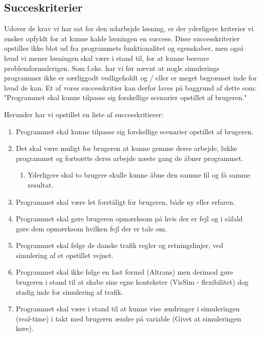 \subsection{Succeskriterier}\label{Succeskriterier}
Udover de krav vi har sat for den udarbejde løsning, er der yderligere kriterier vi ønsker opfyldt for at kunne kalde løsningen en success. Disse successkriterier opstilles ikke blot ud fra programmets funktionalitet og egenskaber, men også hvad vi mener løsningen skal være i stand til, for at kunne besvare problemformulerigen. Som f.eks. har vi før nævnt at nogle simulerings programmer ikke er særliggodt vedligeholdt og / eller er meget begrænset inde for hvad de kan. Et af vores successkritier kan derfor laves på baggrund af dette som: "Programmet skal kunne tilpasse sig forskellige scenarier opstillet af brugeren."

\vspace{5mm}
Herunder har vi opstillet en liste af successkritierer:

\begin{enumerate}
\item Programmet skal kunne tilpasse sig forskellige scenarier opstillet af brugeren.
\item Det skal være muligt for brugeren at kunne gemme deres arbejde, lukke programmet og fortsætte deres arbejde næste gang de åbner programmet.
\begin{enumerate}
\item Yderligere skal to brugere skulle kunne åbne den samme fil og få samme resultat.
\end{enumerate}
\item Programmet skal være let forståligt for brugeren, både ny eller erfaren.
\item Programmet skal gøre brugeren opmærksom på hvis der er fejl og i såfald gøre dem opmærksom hvilken fejl der er tale om.
\item Programmet skal følge de danske trafik regler og retningslinjer, ved simulering af et opstillet vejnet.
\item Programmet skal ikke følge en fast formel (Altrans) men derimod gøre brugeren i stand til at skabe sine egne kontekster (VisSim - flexibilitet) dog stadig inde for simulering af trafik.
\item Programmet skal være i stand til at kunne vise ændringer i simuleringen (real-time) i takt med brugeren ændre på variable (Givet at simuleringen køre).
\end{enumerate}

